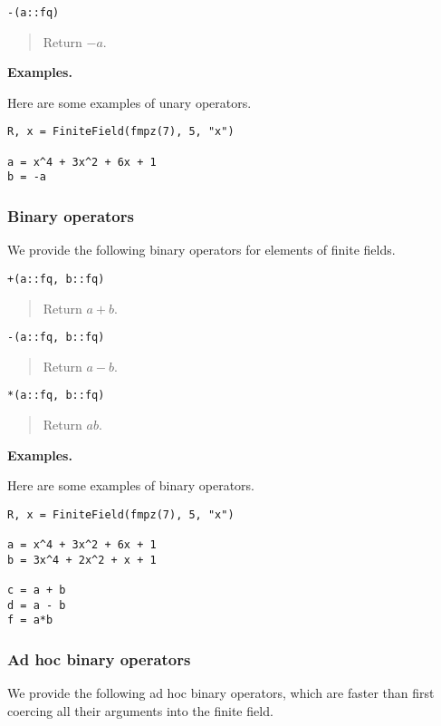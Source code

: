 \documentclass[a4paper,10pt]{article}
\newcommand{\desc}[1]{\vspace{-3mm}\begin{quote}#1\end{quote}}
\begin{document}
{{\begin{lstlisting}
-(a::fq)
\end{lstlisting}

\desc{Return $-a$.}

\textbf{Examples.}

Here are some examples of unary operators.

\begin{lstlisting}
R, x = FiniteField(fmpz(7), 5, "x")

a = x^4 + 3x^2 + 6x + 1
b = -a
\end{lstlisting}

\subsubsection{Binary operators}

We provide the following binary operators for elements of
finite fields.

\begin{lstlisting}
+(a::fq, b::fq)
\end{lstlisting}

\desc{Return $a + b$.}

\begin{lstlisting}
-(a::fq, b::fq)
\end{lstlisting}

\desc{Return $a - b$.}

\begin{lstlisting}
*(a::fq, b::fq)
\end{lstlisting}

\desc{Return $ab$.}

\textbf{Examples.}

Here are some examples of binary operators.

\begin{lstlisting}
R, x = FiniteField(fmpz(7), 5, "x")

a = x^4 + 3x^2 + 6x + 1
b = 3x^4 + 2x^2 + x + 1

c = a + b
d = a - b
f = a*b
\end{lstlisting}

\subsubsection{Ad hoc binary operators}

We provide the following ad hoc binary operators, which are faster than first
coercing all their arguments into the finite field.

}}
\end{document}

